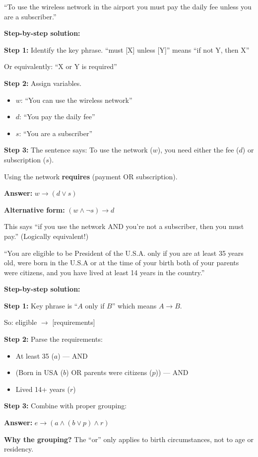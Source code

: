 \documentclass[11pt,a4paper]{article}
\begin{document}
\begin{examplebox}
``To use the wireless network in the airport you must pay the daily fee unless you are a subscriber.''

\textbf{Step-by-step solution:}

\textbf{Step 1:} Identify the key phrase. ``must [X] unless [Y]'' means ``if not Y, then X''

Or equivalently: ``X or Y is required''

\textbf{Step 2:} Assign variables.
\begin{itemize}[noitemsep]
    \item $w$: ``You can use the wireless network''
    \item $d$: ``You pay the daily fee''
    \item $s$: ``You are a subscriber''
\end{itemize}

\textbf{Step 3:} The sentence says: To use the network ($w$), you need either the fee ($d$) or subscription ($s$).

Using the network \textbf{requires} (payment OR subscription).

\textbf{Answer:} $w \to (d \lor s)$

\textbf{Alternative form:} $(w \land \neg s) \to d$

This says ``if you use the network AND you're not a subscriber, then you must pay.'' (Logically equivalent!)
\end{examplebox}

\begin{examplebox}
``You are eligible to be President of the U.S.A. only if you are at least 35 years old, were born in the U.S.A or at the time of your birth both of your parents were citizens, and you have lived at least 14 years in the country.''

\textbf{Step-by-step solution:}

\textbf{Step 1:} Key phrase is ``$A$ only if $B$'' which means $A \to B$.

So: eligible $\to$ [requirements]

\textbf{Step 2:} Parse the requirements:
\begin{itemize}[noitemsep]
    \item At least 35 ($a$) --- AND
    \item (Born in USA ($b$) OR parents were citizens ($p$)) --- AND
    \item Lived 14+ years ($r$)
\end{itemize}

\textbf{Step 3:} Combine with proper grouping:

\textbf{Answer:} $e \to (a \land (b \lor p) \land r)$

\textbf{Why the grouping?} The ``or'' only applies to birth circumstances, not to age or residency.
\end{examplebox}
\end{document}
